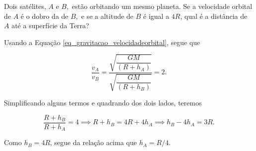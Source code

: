\begin{exemplo}[Nível II]\label{exemplo_gravitacao_velocidadeorbitalex02}

Dois satélites, $A$ e $B,$ estão orbitando um mesmo planeta. Se a velocidade orbital de $A$ é o dobro da de $B,$ e se a altitude de $B$ é igual a $4R$, qual é a distância de $A$ até a superfície da Terra?

\resolucao

Usando a Equação \eqref{eq_gravitacao_velocidadeorbital}, segue que

$$ \dfrac{v_A}{v_B} = \dfrac{\sqrt{\dfrac{GM}{(R+h_A)}}}{\sqrt{\dfrac{GM}{(R+h_B)}}} = 2.$$

Simplificando alguns termos e quadrando dos dois lados, teremos

$$ \dfrac{R+h_B}{R+h_A} = 4 \implies  R + h_B = 4R + 4h_A \implies h_B - 4h_A = 3R. $$

Como $h_B = 4R$, segue da relação acima que $\boxed{h_A = R/4.}$


\end{exemplo}

\vspace{0.3cm}

